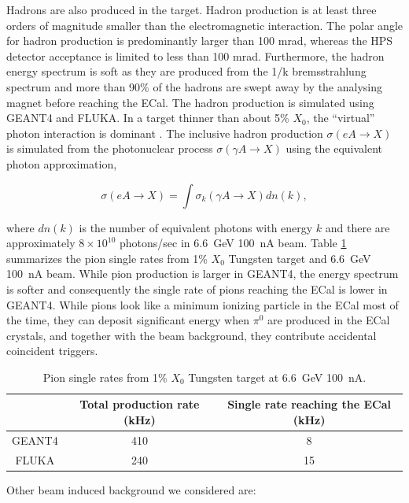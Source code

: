Hadrons are also produced in the target. Hadron production is at least three orders
of magnitude smaller than the electromagnetic interaction. The polar angle for hadron production
is predominantly larger than 100 mrad, whereas the HPS detector acceptance is limited to less than
100 mrad. Furthermore, the hadron energy spectrum is soft as they are produced from the 1/k bremsstrahlung
spectrum and more than 90\% of the hadrons are swept away by the analysing magnet before reaching the ECal.
 The hadron production is simulated using GEANT4 and FLUKA. In a target thinner than
about 5\% $X_0$, the ``virtual'' photon interaction is dominant \cite{mohring}. The inclusive hadron
production ${\sigma (eA\rightarrow X)}$ is simulated from the photonuclear process ${\sigma (\gamma A
\rightarrow X)}$ using the equivalent photon approximation,

$$ \sigma (eA \rightarrow X) = \int \sigma_k(\gamma A \rightarrow X) dn(k), $$

\noindent
where $dn(k)$ is the number of equivalent photons with energy $k$ \cite{budnev} and there are 
approximately $8 \times 10^{10} $ photons/sec in 6.6~GeV 100~nA beam. 
Table \ref{tab:pion} summarizes the pion single rates from 1\% $X_0$ Tungsten target
and 6.6~GeV 100~nA beam. While pion production is larger in GEANT4, the energy spectrum is softer and
consequently the single rate of pions reaching the ECal is lower in GEANT4. While pions look like a minimum 
ionizing particle in the ECal most of the time, they can deposit significant energy when ${\pi^0}$ are
produced in the ECal crystals, and together with the beam background, they contribute accidental coincident triggers. 

\begin{table}[ht]
\begin{center}
\begin{tabular}{|c|c|c|} \hline
  & Total production rate (kHz) & Single rate reaching the ECal (kHz) \\ \hline
GEANT4 & 410 & 8 \\ \hline
FLUKA  & 240 & 15 \\ \hline
\end{tabular}
\end{center}
\caption{\small{Pion single rates from 1\% $X_0$ Tungsten target at 6.6~GeV 100~nA.}}
\label{tab:pion}
\end{table}

\pagebreak
\noindent
Other beam induced background we considered are:

